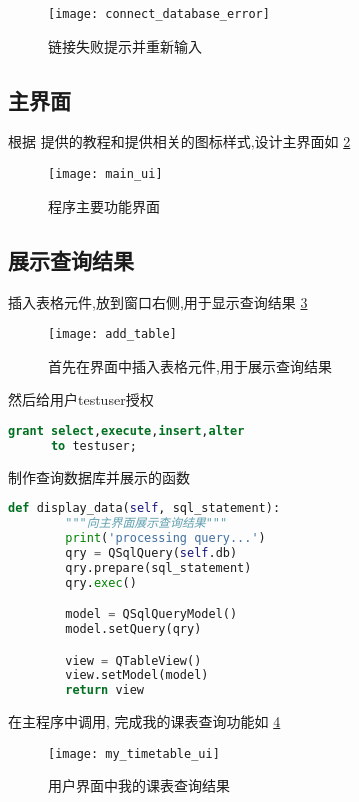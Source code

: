 \documentclass{myreport}
\begin{document}
    \begin{figure}[H]
      \centering
      \texttt{[image: connect\_database\_error]}
      \caption{链接失败提示并重新输入}
      \label{fig:connect_database_error}
    \end{figure}

  \subsection{主界面}
    根据 \cite{pyqt5_beautify} 提供的教程和\cite{icon}提供相关的图标样式,设计主界面如
    \cref{fig:main_ui}
    \begin{figure}[H]
      \centering
      \texttt{[image: main\_ui]}
      \caption{程序主要功能界面}
      \label{fig:main_ui}
    \end{figure}

  \subsection{展示查询结果}

    插入表格元件,放到窗口右侧,用于显示查询结果
    \cref{fig:add_table}
    \begin{figure}[H]
      \centering
      \texttt{[image: add\_table]}
      \caption{首先在界面中插入表格元件,用于展示查询结果}
      \label{fig:add_table}
    \end{figure}

    然后给用户testuser授权
    \begin{lstlisting}[language=sql]
      grant select,execute,insert,alter
      to testuser;
    \end{lstlisting}

    制作查询数据库并展示的函数
    \begin{lstlisting}[language=python]
    def display_data(self, sql_statement):
        """向主界面展示查询结果"""
        print('processing query...')
        qry = QSqlQuery(self.db)
        qry.prepare(sql_statement)
        qry.exec()

        model = QSqlQueryModel()
        model.setQuery(qry)

        view = QTableView()
        view.setModel(model)
        return view
    \end{lstlisting}
    在主程序中调用, 完成我的课表查询功能如
    \cref{fig:my_timetable_ui}
    \begin{figure}[H]
      \centering
      \texttt{[image: my\_timetable\_ui]}
      \caption{用户界面中我的课表查询结果}
      \label{fig:my_timetable_ui}
    \end{figure}
\end{document}
